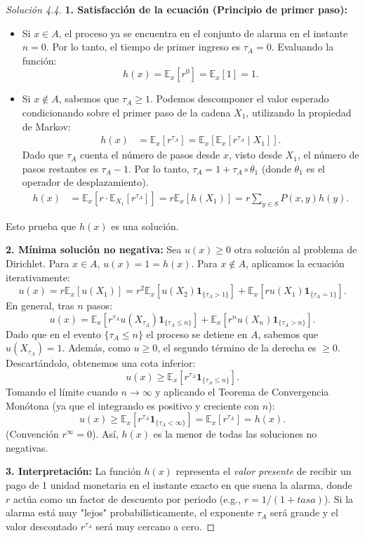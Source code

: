 \documentclass[10pt,a4paper]{article}
\begin{document}
\begin{proof}[Solución  4.4]
    \textbf{1. Satisfacción de la ecuación (Principio de primer paso):}
    \begin{itemize}
        \item Si $x \in A$, el proceso ya se encuentra en el conjunto de alarma en el instante $n=0$. Por lo tanto, el tiempo de primer ingreso es $\tau_A = 0$. Evaluando la función:
        \[ h(x) = \mathbb{E}_x[r^0] = \mathbb{E}_x[1] = 1. \]
        \item Si $x \notin A$, sabemos que $\tau_A \ge 1$. Podemos descomponer el valor esperado condicionando sobre el primer paso de la cadena $X_1$, utilizando la propiedad de Markov:
        \begin{align*}
            h(x) &= \mathbb{E}_x[r^{\tau_A}] = \mathbb{E}_x \left[ \mathbb{E}_x[r^{\tau_A} \mid X_1] \right].
        \end{align*}
        Dado que $\tau_A$ cuenta el número de pasos desde $x$, visto desde $X_1$, el número de pasos restantes es $\tau_A - 1$. Por lo tanto, $\tau_A = 1 + \tau_A \circ \theta_1$ (donde $\theta_1$ es el operador de desplazamiento).
        \begin{align*}
            h(x) &= \mathbb{E}_x \left[ r \cdot \mathbb{E}_{X_1}[r^{\tau_A}] \right] = r \mathbb{E}_x[h(X_1)] = r \sum_{y \in S} P(x,y)h(y).
        \end{align*}
    \end{itemize}
    Esto prueba que $h(x)$ es una solución.

    \textbf{2. Mínima solución no negativa:}
    Sea $u(x) \ge 0$ otra solución al problema de Dirichlet. 
    Para $x \in A$, $u(x) = 1 = h(x)$.
    Para $x \notin A$, aplicamos la ecuación iterativamente:
    \[ u(x) = r \mathbb{E}_x[u(X_1)] = r^2 \mathbb{E}_x[u(X_2) \mathbf{1}_{\{\tau_A > 1\}}] + \mathbb{E}_x[r u(X_1) \mathbf{1}_{\{\tau_A = 1\}}]. \]
    En general, tras $n$ pasos:
    \[ u(x) = \mathbb{E}_x[r^{\tau_A} u(X_{\tau_A}) \mathbf{1}_{\{\tau_A \le n\}}] + \mathbb{E}_x[r^n u(X_n) \mathbf{1}_{\{\tau_A > n\}}]. \]
    Dado que en el evento $\{\tau_A \le n\}$ el proceso se detiene en $A$, sabemos que $u(X_{\tau_A}) = 1$. Además, como $u \ge 0$, el segundo término de la derecha es $\ge 0$. Descartándolo, obtenemos una cota inferior:
    \[ u(x) \ge \mathbb{E}_x[r^{\tau_A} \mathbf{1}_{\{\tau_A \le n\}}]. \]
    Tomando el límite cuando $n \to \infty$ y aplicando el Teorema de Convergencia Monótona (ya que el integrando es positivo y creciente con $n$):
    \[ u(x) \ge \mathbb{E}_x[r^{\tau_A} \mathbf{1}_{\{\tau_A < \infty\}}] = \mathbb{E}_x[r^{\tau_A}] = h(x). \]
    (Convención $r^\infty = 0$). Así, $h(x)$ es la menor de todas las soluciones no negativas.

    \textbf{3. Interpretación:}
    La función $h(x)$ representa el \textit{valor presente} de recibir un pago de 1 unidad monetaria en el instante exacto en que suena la alarma, donde $r$ actúa como un factor de descuento por periodo (e.g., $r = 1/(1+tasa)$). Si la alarma está muy "lejos" probabilísticamente, el exponente $\tau_A$ será grande y el valor descontado $r^{\tau_A}$ será muy cercano a cero.
\end{proof}
\end{document}
